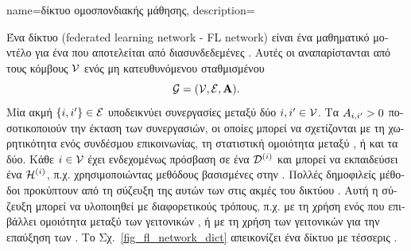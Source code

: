 {name={\foreignlanguage{greek}{δίκτυο ομοσπονδιακής μάθησης}},
	description={\foreignlanguage{greek}{Ένα δίκτυο}  
		(federated learning network - FL network) \foreignlanguage{greek}{είναι ένα μαθηματικό μοντέλο για ένα}  
		\foreignlanguage{greek}{που αποτελείται από διασυνδεδεμένες} . \foreignlanguage{greek}{Αυτές οι} 
		 \foreignlanguage{greek}{αναπαρίστανται από τους κόμβους $\mathcal{V}$ ενός μη κατευθυνόμενου 
		σταθμισμένου} 
		\[
			\mathcal{G} = (\mathcal{V},\mathcal{E},{\bf A}).
		\]
		\foreignlanguage{greek}{Μία ακμή $\{i,i'\} \in \mathcal{E}$ υποδεικνύει συνεργασίες μεταξύ δύο}  
		$i, i' \in \mathcal{V}$. \foreignlanguage{greek}{Τα}  $A_{i,i'} > 0$ 
		\foreignlanguage{greek}{ποσοτικοποιούν την έκταση των συνεργασιών, οι οποίες μπορεί να σχετίζονται με τη χωρητικότητα 
		ενός συνδέσμου επικοινωνίας, τη στατιστική ομοιότητα μεταξύ} , \foreignlanguage{greek}{ή και τα δύο. 
		Κάθε}  $i \in \mathcal{V}$ \foreignlanguage{greek}{έχει ενδεχομένως πρόσβαση σε ένα}
		 $\mathcal{D}^{(i)}$ \foreignlanguage{greek}{και μπορεί να εκπαιδεύσει ένα}  
		$\mathcal{H}^{(i)}$, \foreignlanguage{greek}{π.χ. χρησιμοποιώντας μεθόδους βασισμένες στην} . 
		\foreignlanguage{greek}{Πολλές δημοφιλείς μέθοδοι}  \foreignlanguage{greek}{προκύπτουν από τη σύζευξη της} 
		 \foreignlanguage{greek}{αυτών των}  \foreignlanguage{greek}{στις ακμές 
		του δικτύου}  \cite{JungFLBook}. \foreignlanguage{greek}{Αυτή η σύζευξη μπορεί να υλοποιηθεί με διαφορετικούς 
		τρόπους, π.χ. με τη χρήση ενός}  \foreignlanguage{greek}{που επιβάλλει ομοιότητα μεταξύ των} 
		 \foreignlanguage{greek}{γειτονικών} , \foreignlanguage{greek}{ή με τη χρήση των} 
		 \foreignlanguage{greek}{γειτονικών}  \foreignlanguage{greek}{για την επαύξηση των} 
		. \foreignlanguage{greek}{Το Σχ.}\ \ref{fig_fl_network_dict} \foreignlanguage{greek}{απεικονίζει ένα δίκτυο} 
		 \foreignlanguage{greek}{με τέσσερις} .
		\begin{figure}[H]

\end{figure}}}
